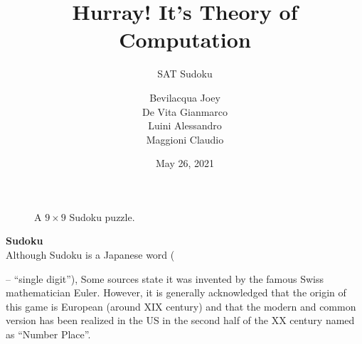 \documentclass[t,aspectratio=1610]{beamer}
\title{Hurray! It's Theory of Computation}
\subtitle{\Large{SAT Sudoku}}
\author{Bevilacqua Joey \\ De Vita Gianmarco \\ Luini Alessandro\\ Maggioni Claudio}
\institute{Universit\`a della Svizzera Italiana\\ Faculty of Informatics\\ \href{http://www.unisi.ch}{www.unisi.ch}}
\date{May 26, 2021}
\newcounter{row}
\newcounter{col}
\newcommand\setrow[9]{
  \setcounter{col}{1}
  \foreach \n in {#1, #2, #3, #4, #5, #6, #7, #8, #9} {
    \edef\x{\value{col} - 0.5}
    \edef\y{9.5 - \value{row}}
    \node[anchor=center] at (\x, \y) {\n};
    \stepcounter{col}
  }
  \stepcounter{row}
}
\begin{document}
{
%
\begin{frame}
\maketitle
\end{frame}
}

\begin{frame}
\begin{figure}[h]
\begin{center}
\end{center}
\caption{A $9\times 9$ Sudoku puzzle.}
\end{figure}
\end{frame}

\begin{frame}
\textbf{Sudoku} \\

Although Sudoku is a Japanese word (\begin{uCJK}\end{uCJK} – ``single digit''),
Some sources state it was invented by the famous Swiss mathematician Euler.
However, it is generally acknowledged that the origin of this game is European
(around XIX century) and that the modern and common version has been realized
in the US in the second half of the XX century named as ``Number Place''.
\end{frame}
\end{document}
